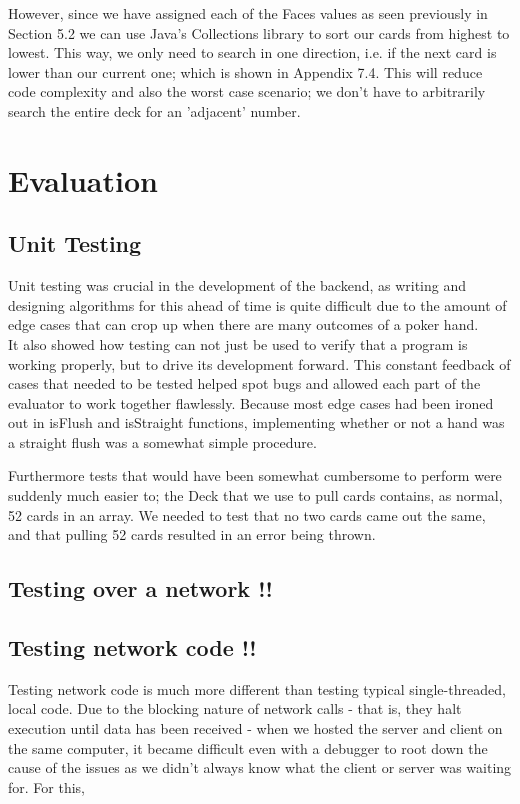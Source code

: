 \documentclass[11pt]{article}
\begin{document}
However, since we have assigned each of the Faces values as seen previously in Section 5.2 we can use Java's Collections library to sort our cards from highest to lowest. This way, we only need to search in one direction, i.e. if the next card is lower than our current one; which is shown in Appendix 7.4. This will reduce code complexity and also the worst case scenario; we don't have to arbitrarily search the entire deck for an 'adjacent' number.


\newpage
\section{Evaluation}
\subsection{Unit Testing}
Unit testing was crucial in the development of the backend, as writing and designing algorithms for this ahead of time is quite difficult due to the amount of edge cases that can crop up when there are many outcomes of a poker hand. \\

It also showed how testing can not just be used to verify that a program is working properly, but to drive its development forward. This constant feedback of cases that needed to be tested helped spot bugs and allowed each part of the evaluator to work together flawlessly. Because most edge cases had been ironed out in isFlush and isStraight functions, implementing whether or not a hand was a straight flush was a somewhat simple procedure. 

Furthermore tests that would have been somewhat cumbersome to perform were suddenly much easier to; the Deck that we use to pull cards contains, as normal, 52 cards in an array. We needed to test that no two cards came out the same, and that pulling 52 cards resulted in an error being thrown. 


\subsection{Testing over a network !!}



\subsection{Testing network code !!}
Testing network code is much more different than testing typical single-threaded, local code. Due to the blocking nature of network calls - that is, they halt execution until data has been received - when we hosted the server and client on the same computer, it became difficult even with a debugger to root down the cause of the issues as we didn't always know what the client or server was waiting for. For this, 
\end{document}
